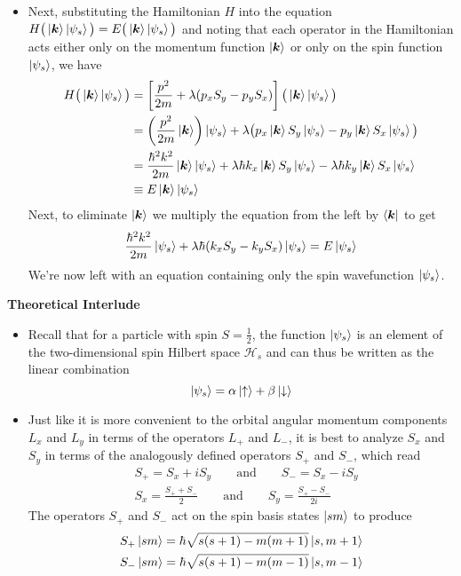\documentclass[11pt, a4paper]{article}
\newcommand{\eqtext}[1]{\qquad \text{#1} \qquad}
\renewcommand{\vec}[1]{\bm{#1}} %
\renewcommand{\H}{\mathcal{H}}  %
\newcommand{\ua}{\uparrow}  %
\newcommand{\da}{\downarrow}  %
\renewcommand{\k}{\vec{k}}  %
\begin{document}
\begin{itemize}
	\item Next, substituting the Hamiltonian $ H $ into the equation $ H\big(\ket{\k} \ket{\psi_{s}}\big) = E \big(\ket{\k} \ket{\psi_{s}}\big) $ and noting that each operator in the Hamiltonian acts either only on the momentum function $ \ket{\k} $ or only on the spin function $ \ket{\psi_{s}} $, we have
	\begin{align*}
		H\big(\ket{\k} \ket{\psi_{s}}\big) &= \left[\frac{p^{2}}{2m} + \lambda (p_{x}S_{y} - p_{y}S_{x})\right]\big(\ket{\k} \ket{\psi_{s}}\big) \\
		& = \left(\frac{p^{2}}{2m}\ket{\k}\right)\ket{\psi_{s}} + \lambda \big(p_{x}\ket{\k} S_{y}\ket{\psi_{s}} - p_{y}\ket{\k} S_{x}\ket{\psi_{s}}\big) \\
		&=\frac{\hbar^{2}k^{2}}{2m}\ket{\k}\ket{\psi_{s}} + \lambda \hbar k_{x}\ket{\k}S_{y}\ket{\psi_{s}} - \lambda \hbar k_{y}\ket{\k}S_{x}\ket{\psi_{s}}\\
		&\equiv E\ket{\k}\ket{\psi_{s}}
	\end{align*}
	Next, to eliminate $ \ket{\k} $ we multiply the equation from the left by $ \bra{\k} $ to get
	\begin{equation*}
		\frac{\hbar^{2}k^{2}}{2m}\ket{\psi_{s}} + \lambda \hbar (k_{x}S_{y} - k_{y}S_{x})\ket{\psi_{s}} = E\ket{\psi_{s}}
	\end{equation*}
	We're now left with an equation containing only the spin wavefunction $ \ket{\psi_{s}} $. 
\end{itemize}

\textbf{Theoretical Interlude}
\begin{itemize}

	\item Recall that for a particle with spin $ S = \frac{1}{2} $, the function $ \ket{\psi_{s}} $ is an element of the two-dimensional spin Hilbert space $ \H_{s} $ and can thus be written as the linear combination
	\begin{equation*}
		\ket{\psi_{s}} = \alpha \ket{\ua} + \beta \ket{\da}
	\end{equation*}

	\item Just like it is more convenient to the orbital angular momentum components $ L_{x} $ and $ L_{y} $ in terms of the operators $ L_{+} $ and $ L_{-} $, it is best to analyze $ S_{x} $ and $ S_{y} $ in terms of the analogously defined operators $ S_{+} $ and $ S_{-} $, which read
	\begin{align*}
		& S_{+} = S_{x} + iS_{y} \eqtext{and} S_{-} = S_{x} - i S_{y}\\
		& S_{x} = \frac{S_{+}+S_{-}}{2} \eqtext{and} S_{y} = \frac{S_{+}-S_{-}}{2i}
	\end{align*}
	The operators $ S_{+} $ and $ S_{-} $ act on the spin basis states $ \ket{sm} $ to produce
	\begin{align*}
		& S_{+} \ket{sm} = \hbar \sqrt{s(s+1) - m(m+1)}\ket{s, m+1}\\
		& S_{-} \ket{sm} = \hbar \sqrt{s(s+1) - m(m-1)}\ket{s, m-1}
	\end{align*}
	
\end{itemize}
\end{document}
